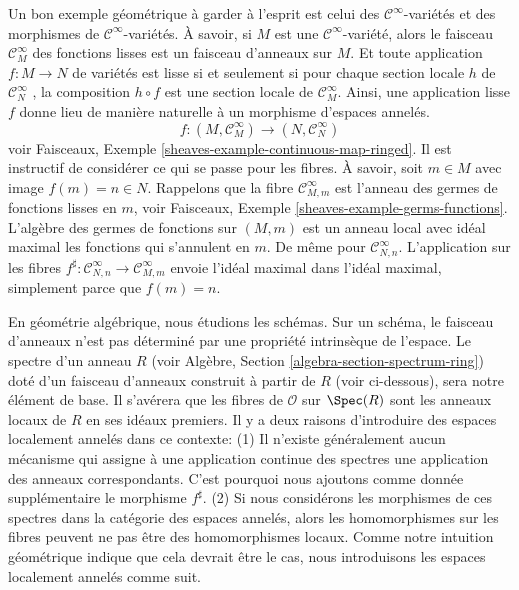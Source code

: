 \medskip\noindent
Un bon exemple géométrique à garder à l'esprit est celui des
 $\mathcal{C}^\infty$-variétés et des morphismes de  $\mathcal{C}^\infty$-variétés. À savoir, si
 $M$  est une  $\mathcal{C}^\infty$-variété, alors le faisceau  $\mathcal{C}^\infty_M$  des
fonctions lisses est un faisceau d'anneaux sur  $M$. Et toute application
 $f : M \to N$  de variétés est lisse si et seulement si pour chaque section locale
 $h$  de  $\mathcal{C}^\infty_N$ , la composition  $h \circ f$  est une section locale
de  $\mathcal{C}^\infty_M$. Ainsi, une application lisse  $f$  donne lieu de manière
naturelle à un morphisme d'espaces annelés.
$$
f : (M , \mathcal{C}^\infty_M) \longrightarrow (N, \mathcal{C}^\infty_N)
$$
voir Faisceaux, Exemple  \ref{sheaves-example-continuous-map-ringed}. Il est instructif de considérer ce qui se
passe pour les fibres. À savoir, soit  $m \in M$  avec image  $f(m) = n \in N$.
Rappelons que la fibre  $\mathcal{C}^\infty_{M, m}$  est l'anneau des germes de fonctions lisses en
 $m$, voir Faisceaux, Exemple  \ref{sheaves-example-germs-functions}. L'algèbre des germes de
fonctions sur  $(M, m)$  est un anneau local avec idéal maximal les fonctions
qui s'annulent en  $m$. De même pour  $\mathcal{C}^\infty_{N, n}$. L'application sur les
fibres  $f^\sharp : \mathcal{C}^\infty_{N, n} \to \mathcal{C}^\infty_{M, m}$  envoie l'idéal maximal dans l'idéal maximal, simplement parce
que  $f(m) = n$.

\medskip\noindent
En géométrie algébrique, nous étudions les schémas. Sur un schéma, le faisceau
d'anneaux n'est pas déterminé par une propriété intrinsèque de l'espace. Le
spectre d'un anneau  $R$  (voir Algèbre, Section  \ref{algebra-section-spectrum-ring}) doté d'un
faisceau d'anneaux construit à partir de  $R$  (voir ci-dessous), sera
notre élément de base. Il s'avérera que les fibres de  $\mathcal{O}$  sur
 $\Spec(R)$  sont les anneaux locaux de  $R$  en ses idéaux premiers. Il y
a deux raisons d'introduire des espaces localement annelés dans ce contexte: (1)
Il n'existe généralement aucun mécanisme qui assigne à une application continue
des spectres une application des anneaux correspondants. C'est pourquoi nous
ajoutons comme donnée supplémentaire le morphisme  $f^\sharp$. (2) Si nous
considérons les morphismes de ces spectres dans la catégorie des espaces annelés,
alors les homomorphismes sur les fibres peuvent ne pas être des homomorphismes
locaux. Comme notre intuition géométrique indique que cela devrait être le cas,
nous introduisons les espaces localement annelés comme suit.

